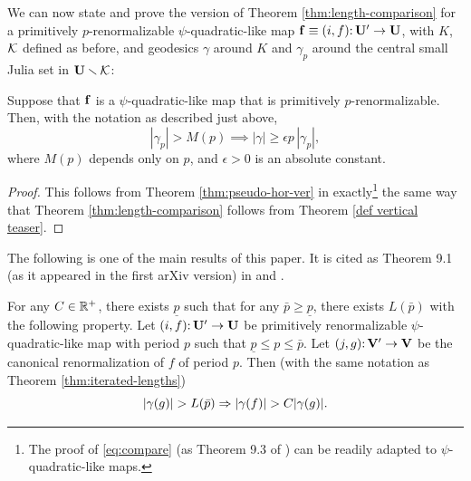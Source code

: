 We can now state and prove the version of Theorem \ref{thm:length-comparison} for a primitively $p$-renormalizable $\psi$-quadratic-like map $\mathbf f \equiv (i, f)\mathpunct: \mathbf U' \to \mathbf U$,
with $K$, ${\mathcal K}$ defined as before, and geodesics $\gamma$ around $K$ and $\gamma_p$ around the central small Julia set in $\mathbf U \smallsetminus {\mathcal K}$:
\begin{theorem} \label{thm:pseudo-lengths}
Suppose that $\mathbf f$ is a $\psi$-quadratic-like map that is primitively $p$-renormalizable.
Then, with the notation as described just above,
\begin{equation} \label{eq:pseudo-length-comparison}
|\gamma_p|> M(p) \implies |\gamma| \ge \epsilon p\, |\gamma_p|,
\end{equation}
where $M(p)$ depends only on $p$, and $\epsilon > 0$ is an absolute constant. 
\end{theorem}

\begin{proof}
This follows from Theorem \ref{thm:pseudo-hor-ver} in exactly\footnote{The proof of \eqref{eq:compare} (as Theorem 9.3 of \cite{McM}) can be readily adapted to $\psi$-quadratic-like maps.}
 the same way that Theorem \ref{thm:length-comparison} follows from Theorem \ref{def vertical teaser}. 
\end{proof}

The following is one of the main results of this paper. 
It is cited as Theorem 9.1 (as it appeared in the first arXiv version)
in \cite{decorations} and \cite{molecules}.


\begin{theorem}\label{improving of length}
For any $C \in {\Bbb R}^+$, there exists $\underline p$ such that for any $\bar p\geq \underline p$,
there exists $L(\bar p)$ with the following property.
Let $(i, f)\mathpunct: \mathbf U'\to \mathbf U$ be primitively renormalizable $\psi$-quadratic-like map
with period $p$ such that  $\underline p\leq p\leq \bar p$.
Let $(j, g)\mathpunct: {\mathbf{V}}' \to {\mathbf{V}}$ be the canonical renormalization of $f$ of period $p$.
Then (with the same notation as Theorem \ref{thm:iterated-lengths})
$$
   |\gamma(g)| > L(\bar p)\Rightarrow |\gamma(f)| > C |\gamma(g)|.
$$
\end{theorem}

